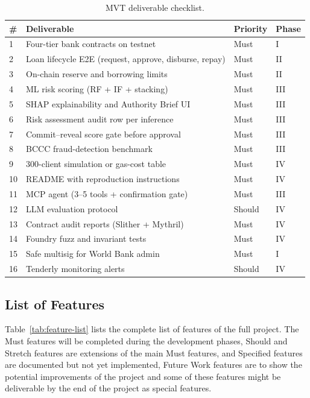 \begin{table}[H]
\centering
\caption[MVT deliverable checklist]{MVT deliverable checklist.}
\label{tab:contributions-vs-future}
\label{tab:mvt-checklist}
\small
\begin{tabular}{p{0.5cm}p{9.2cm}p{1.8cm}p{1.8cm}}
\toprule
\tableheadcolor
\textbf{\#} & \textbf{Deliverable} & \textbf{Priority} & \textbf{Phase} \\
\midrule
1 & Four-tier bank contracts on testnet & Must & I \\
2 & Loan lifecycle E2E (request, approve, disburse, repay) & Must & II \\
3 & On-chain reserve and borrowing limits & Must & II \\
4 & ML risk scoring (RF + IF + stacking) & Must & III \\
5 & SHAP explainability and Authority Brief UI & Must & III \\
6 & Risk assessment audit row per inference & Must & III \\
7 & Commit--reveal score gate before approval & Must & III \\
8 & BCCC fraud-detection benchmark & Must & III \\
9 & 300-client simulation or gas-cost table & Must & IV \\
10 & README with reproduction instructions & Must & IV \\
11 & MCP agent (3--5 tools + confirmation gate) & Must & III \\
12 & LLM evaluation protocol & Should & IV \\
13 & Contract audit reports (Slither + Mythril) & Must & IV \\
14 & Foundry fuzz and invariant tests & Must & IV \\
15 & Safe multisig for World Bank admin & Must & I \\
16 & Tenderly monitoring alerts & Should & IV \\
\bottomrule
\end{tabular}
\end{table}



\subsection{List of Features}
\label{sec:feature-list}

Table~\ref{tab:feature-list} lists the complete list of features of the full project. The Must features will be completed during the development phases, Should and Stretch features are extensions of the main Must features, and Specified features are documented but not yet implemented, Future Work features are to show the potential improvements of the project and some of these features might be deliverable by the end of the project as special features.

